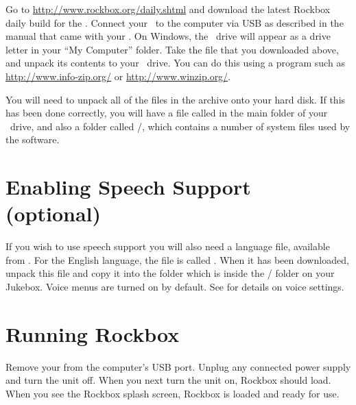 	Go to \url{http://www.rockbox.org/daily.shtml} and download the latest 
	Rockbox daily build for the \playertype{}.  Connect your \playerman\ to the 
	computer via USB as described in the manual that came with your \playerman{}. 
	On Windows, the	\playerman\ drive will appear as a drive letter in your 
	``My Computer''	folder. Take the file that you downloaded above, and unpack 
	its contents to	your \playerman\ drive. You can do this using a program 
	such as \url{http://www.info-zip.org/} or \url{http://www.winzip.org/}.


	You will need to unpack all of the files in the archive onto your hard disk. 
	If this has been done correctly, you will have a file called 
	\fname{\firmwarefilename} in the main folder of your \playerman\ drive, and 
	also a folder called /, which contains a number of system 
	files used by the software. 
	

\section{Enabling Speech Support (optional)}\label{sec:enabling_speech_support} 
If you wish to use speech support you will also need a language file, available 
from .  For the English language, the file is called 
. When it has been downloaded, unpack this file and copy it 
into the  folder which is inside the / folder on 
your Jukebox. Voice menus are turned on by default. See 
 for details on voice settings.

\section{Running Rockbox} 
Remove your \dap from the computer's USB port. Unplug any connected power supply 
and turn the unit off. When you next turn the unit on, Rockbox should load. When 
you see the Rockbox splash screen, Rockbox is loaded and ready for use.

